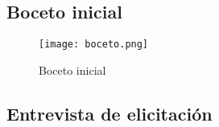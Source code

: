 \subsection*{Boceto inicial}
\begin{figure}[H]
\centering
    \texttt{[image: boceto.png]} 
    \caption{Boceto inicial}
\end{figure}
\newpage
\subsection*{Entrevista de elicitación}
